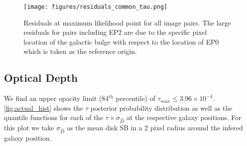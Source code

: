 \documentclass{aa}
\begin{document}

\begin{figure*}[ht]
	\centering
	\texttt{[image: figures/residuals\_common\_tau.png]}
	\caption{Residuals at maximum likelihood point for all image pairs. The large residuals for pairs including EP2 are due to the specific pixel location of the galactic bulge with respect to the location of EP0 which is taken as the reference origin.}
	\label{fig:actual_subtracted_images_ep1}
\end{figure*}

\subsection{Optical Depth}
\label{sec:res_disk_properties}

We find an upper opacity limit (84$^{th}$ percentile) of $\tau_{max} \leq 3.96 \times10^{-4}$. \autoref{fig:actual_hist} shows the $\tau$ posterior probability distribution as well as the quantile functions for each of the $\tau \times \sigma_{\hat{D}}$ at the respective galaxy positions. For this plot we take $\sigma_{\hat{D}}$ as the mean disk SB in a 2 pixel radius around the infered galaxy position.

\end{document}
